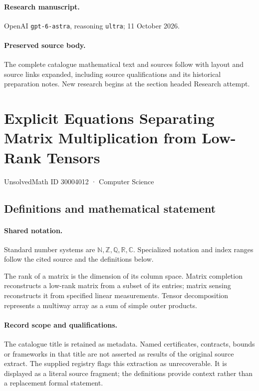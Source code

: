 \documentclass[11pt]{article}
\begin{document}
\paragraph{Research manuscript.} OpenAI \texttt{gpt-6-astra}, reasoning \texttt{ultra}; 11 October 2026.
\paragraph{Preserved source body.} The complete catalogue mathematical text and sources follow with layout and source links expanded, including source qualifications and its historical preparation notes. New research begins at the section headed Research attempt.

\section{Explicit Equations Separating Matrix Multiplication from Low-Rank Tensors}\label{30004012}
{\small UnsolvedMath ID 30004012 · Computer Science}
\subsection{Definitions and mathematical statement}

\paragraph{Shared notation.}Standard number systems are $\mathbb N,\mathbb Z,\mathbb Q,\mathbb R,\mathbb C$. Specialized notation and index ranges follow the cited source and the definitions below.


The rank of a matrix is the dimension of its column space. Matrix completion reconstructs a low-rank matrix from a subset of its entries; matrix sensing reconstructs it from specified linear measurements. Tensor decomposition represents a multiway array as a sum of simple outer products.
\paragraph{Record scope and qualifications.}
The catalogue title is retained as metadata. Named certificates, contracts, bounds or frameworks in that title are not asserted as results of the original source extract.
The supplied registry flags this extraction as unrecoverable. It is displayed as a literal source fragment; the definitions provide context rather than a replacement formal statement.
\end{document}
